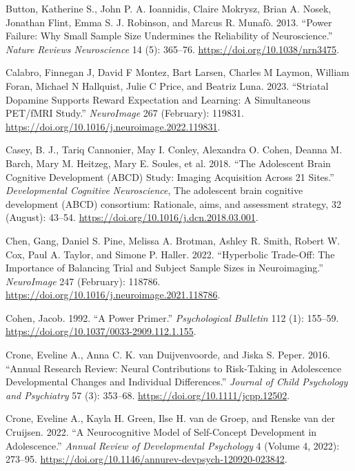 \documentclass[
  letterpaper,
  DIV=11,
  numbers=noendperiod]{scrartcl}
\newlength{\cslhangindent}
\newenvironment{CSLReferences}[2] %
 {\begin{list}{}{%
  \setlength{\itemindent}{0pt}
  \setlength{\leftmargin}{0pt}
  \setlength{\parsep}{0pt}
  \ifodd #1
   \setlength{\leftmargin}{\cslhangindent}
   \setlength{\itemindent}{-1\cslhangindent}
  \fi
  \setlength{\itemsep}{#2\baselineskip}}}
 {\end{list}}
\begin{document}
\begin{CSLReferences}{1}{0}
Button, Katherine S., John P. A. Ioannidis, Claire Mokrysz, Brian A.
Nosek, Jonathan Flint, Emma S. J. Robinson, and Marcus R. Munafò. 2013.
{``Power Failure: Why Small Sample Size Undermines the Reliability of
Neuroscience.''} \emph{Nature Reviews Neuroscience} 14 (5): 365--76.
\url{https://doi.org/10.1038/nrn3475}.

Calabro, Finnegan J, David F Montez, Bart Larsen, Charles M Laymon,
William Foran, Michael N Hallquist, Julie C Price, and Beatriz Luna.
2023. {``Striatal Dopamine Supports Reward Expectation and Learning: A
Simultaneous PET/fMRI Study.''} \emph{NeuroImage} 267 (February):
119831. \url{https://doi.org/10.1016/j.neuroimage.2022.119831}.

Casey, B. J., Tariq Cannonier, May I. Conley, Alexandra O. Cohen, Deanna
M. Barch, Mary M. Heitzeg, Mary E. Soules, et al. 2018. {``The
Adolescent Brain Cognitive Development (ABCD) Study: Imaging Acquisition
Across 21 Sites.''} \emph{Developmental Cognitive Neuroscience}, The
adolescent brain cognitive development (ABCD) consortium: Rationale,
aims, and assessment strategy, 32 (August): 43--54.
\url{https://doi.org/10.1016/j.dcn.2018.03.001}.

Chen, Gang, Daniel S. Pine, Melissa A. Brotman, Ashley R. Smith, Robert
W. Cox, Paul A. Taylor, and Simone P. Haller. 2022. {``Hyperbolic
Trade-Off: The Importance of Balancing Trial and Subject Sample Sizes in
Neuroimaging.''} \emph{NeuroImage} 247 (February): 118786.
\url{https://doi.org/10.1016/j.neuroimage.2021.118786}.

Cohen, Jacob. 1992. {``A Power Primer.''} \emph{Psychological Bulletin}
112 (1): 155--59. \url{https://doi.org/10.1037/0033-2909.112.1.155}.

Crone, Eveline A., Anna C. K. van Duijvenvoorde, and Jiska S. Peper.
2016. {``Annual Research Review: Neural Contributions to Risk-Taking in
Adolescence {\textendash} Developmental Changes and Individual
Differences.''} \emph{Journal of Child Psychology and Psychiatry} 57
(3): 353--68. \url{https://doi.org/10.1111/jcpp.12502}.

Crone, Eveline A., Kayla H. Green, Ilse H. van de Groep, and Renske van
der Cruijsen. 2022. {``A Neurocognitive Model of Self-Concept
Development in Adolescence.''} \emph{Annual Review of Developmental
Psychology} 4 (Volume 4, 2022): 273--95.
\url{https://doi.org/10.1146/annurev-devpsych-120920-023842}.


\end{CSLReferences}
\end{document}
